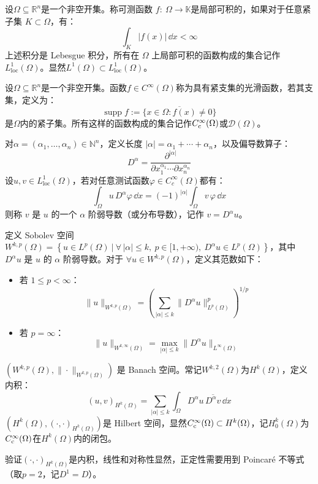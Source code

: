 \begin{definition}[局部可积函数]
设$\Omega \subseteq \mathbb{R}^n$是一个非空开集。称可测函数 $f: \ \Omega \to \mathbb{K}$是局部可积的，如果对于任意紧子集 $K \subset \Omega$，有：
\[\int_K |f(x)| \, \dd{x} < \infty\]
上述积分是 Lebesgue 积分，所有在 $\Omega$ 上局部可积的函数构成的集合记作 $L^1_{\text{loc}}(\Omega)$。显然$L^1(\Omega) \subset L^1_{\text{loc}}(\Omega)$。
\end{definition}

\begin{definition}[具有紧支集的光滑函数]
设$\Omega \subseteq \mathbb{R}^n$是一个非空开集。函数$f \in C^\infty(\Omega)$称为具有紧支集的光滑函数，若其支集，定义为：
\[\operatorname{supp} f := \overline{\{ x \in \Omega : f(x) \neq 0 \}}\]
是$\Omega$内的紧子集。所有这样的函数构成的集合记作$C_{\rm{c}}^{\infty}(\Omega)$或$\mathcal{D}(\Omega)$。
\end{definition}

\begin{definition}[弱导数]
对$\alpha = (\alpha_1,\dots,\alpha_n) \in \mathbb{N}^n$，定义长度 $|\alpha| = \alpha_1+\cdots+\alpha_n$，以及偏导数算子：
\[D^\alpha = \frac{\partial^{|\alpha|}}{\partial x_1^{\alpha_1} \cdots \partial x_n^{\alpha_n}}\]
设$u, v \in L^1_{\text{loc}}(\Omega)$，若对任意测试函数$\varphi \in C_c^\infty(\Omega)$都有：
\[\int_{\Omega} u \, D^\alpha \varphi \, \dd{x} = (-1)^{|\alpha|} \int_{\Omega} v \, \varphi \, \dd{x}\]
则称 $v$ 是 $u$ 的一个 $\alpha$ 阶弱导数（或分布导数），记作 $v = D^\alpha u$。
\end{definition}

\begin{definition}
定义 Sobolev 空间$W^{k,p}(\Omega)= \left\{ u \in L^p(\Omega) \ | \  
\forall\, |\alpha| \le k, \ p \in [1,+\infty), \ D^\alpha u \in L^p(\Omega)\right\}$，其中 $D^\alpha u$ 是 $u$ 的 $\alpha$ 阶弱导数。对于 $\forall u \in W^{k,p}(\Omega)$，定义其范数如下：
\begin{itemize}
\item 若 $1 \le p < \infty$：
\[\|u\|_{W^{k,p}(\Omega)}=\left( \sum_{|\alpha| \le k} \|D^\alpha u\|_{L^p(\Omega)}^p \right)^{1/p}\]
\item 若 $p = \infty$：
\[\|u\|_{W^{k,\infty}(\Omega)}=\max_{|\alpha| \le k} \|D^\alpha u\|_{L^\infty(\Omega)}\]
\end{itemize}
$(W^{k,p}(\Omega),\|\cdot\|_{W^{k,p}(\Omega)})$ 是 Banach 空间。常记$W^{k,2}(\Omega)$为$H^k(\Omega)$，定义内积：
\[(u,v)_{H^k(\Omega)} = \sum_{|\alpha| \le k} \int_{\Omega} D^\alpha u \, \overline{D^\alpha v} \, \dd{x}\]
$(H^k(\Omega),(\cdot,\cdot)_{H^k(\Omega)})$是 Hilbert 空间，显然$C_{\rm{c}}^{\infty}(\Omega) \subset H^k(\Omega)$，记$H_0^k(\Omega)$为$C_{\rm{c}}^{\infty}(\Omega)$在$H^k(\Omega)$内的闭包。
\end{definition}
\begin{remark}
\quad 验证$(\cdot,\cdot)_{H^k(\Omega)}$是内积，线性和对称性显然，正定性需要用到 Poincar\'{e} 不等式（取$p=2$，记$D^1=D$）。
\end{remark}

